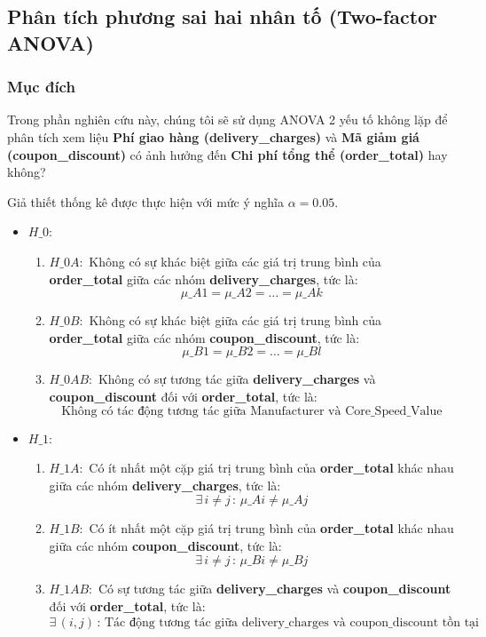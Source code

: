 
\subsection{Phân tích phương sai hai nhân tố (Two-factor ANOVA)}
\subsubsection{Mục đích}
Trong phần nghiên cứu này, chúng tôi sẽ sử dụng ANOVA 2 yếu tố không lặp để phân tích xem liệu \textbf{Phí giao hàng (delivery\_charges)} và \textbf{Mã giảm giá  (coupon\_discount)} có ảnh hưởng đến \textbf{Chi phí tổng thể (order\_total)} hay không?

Giả thiết thống kê được thực hiện với mức ý nghĩa $\alpha = 0.05$.

\begin{itemize}
    \item \( H\_0 \): 
    \begin{enumerate}
        \item \( H\_{0A}: \) Không có sự khác biệt giữa các giá trị trung bình của \textbf{order\_total} giữa các nhóm \textbf{delivery\_charges}, tức là:
        \[
        \mu\_{A1} = \mu\_{A2} = \ldots = \mu\_{Ak}
        \]
        \item \( H\_{0B}: \) Không có sự khác biệt giữa các giá trị trung bình của \textbf{order\_total} giữa các nhóm \textbf{coupon\_discount}, tức là:
        \[
        \mu\_{B1} = \mu\_{B2} = \ldots = \mu\_{Bl}
        \]
        \item \( H\_{0AB}: \) Không có sự tương tác giữa \textbf{delivery\_charges} và \textbf{coupon\_discount} đối với \textbf{order\_total}, tức là:
        \[
        \text{Không có tác động tương tác giữa Manufacturer và Core\_Speed\_Value}
        \]
    \end{enumerate}
    
    \item \( H\_1 \): 
    \begin{enumerate}
        \item \( H\_{1A}: \) Có ít nhất một cặp giá trị trung bình của \textbf{order\_total} khác nhau giữa các nhóm \textbf{delivery\_charges}, tức là:
        \[
        \exists \, i \neq j \, : \, \mu\_{Ai} \neq \mu\_{Aj}
        \]
        \item \( H\_{1B}: \) Có ít nhất một cặp giá trị trung bình của \textbf{order\_total} khác nhau giữa các nhóm \textbf{coupon\_discount}, tức là:
        \[
        \exists \, i \neq j \, : \, \mu\_{Bi} \neq \mu\_{Bj}
        \]
        \item \( H\_{1AB}: \) Có sự tương tác giữa \textbf{delivery\_charges} và \textbf{coupon\_discount} đối với \textbf{order\_total}, tức là:
        \[
        \exists \, (i, j) \, : \, \text{Tác động tương tác giữa delivery\_charges và coupon\_discount tồn tại}
        \]
    \end{enumerate}
\end{itemize}
